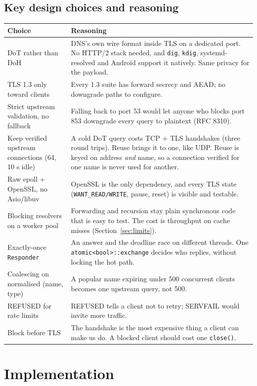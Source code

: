 \documentclass[11pt,a4paper]{article}
\newcommand{\code}[1]{\texttt{#1}}
\begin{document}
\subsection{Key design choices and reasoning}
\begin{tabularx}{\textwidth}{@{}P{4.2cm}L@{}}
\toprule
Choice & Reasoning \\
\midrule
DoT rather than DoH & DNS's own wire format inside TLS on a dedicated port. No HTTP/2 stack needed, and \code{dig}, \code{kdig}, systemd-resolved and Android support it natively. Same privacy for the payload. \\
TLS 1.3 only toward clients & Every 1.3 suite has forward secrecy and AEAD; no downgrade paths to configure. \\
Strict upstream validation, no fallback & Falling back to port 53 would let anyone who blocks port 853 downgrade every query to plaintext (RFC 8310). \\
Keep verified upstream connections (64, 10 s idle) & A cold DoT query costs TCP + TLS handshakes (three round trips). Reuse brings it to one, like UDP. Reuse is keyed on address \emph{and} name, so a connection verified for one name is never used for another. \\
Raw epoll + OpenSSL, no Asio/libuv & OpenSSL is the only dependency, and every TLS state (\code{WANT\_READ/WRITE}, pause, reset) is visible and testable. \\
Blocking resolvers on a worker pool & Forwarding and recursion stay plain synchronous code that is easy to test. The cost is throughput on cache misses (Section~\ref{sec:limits}). \\
Exactly-once \code{Responder} & An answer and the deadline race on different threads. One \code{atomic<bool>::exchange} decides who replies, without locking the hot path. \\
Coalescing on normalised (name, type) & A popular name expiring under 500 concurrent clients becomes one upstream query, not 500. \\
REFUSED for rate limits & REFUSED tells a client not to retry; SERVFAIL would invite more traffic. \\
Block before TLS & The handshake is the most expensive thing a client can make us do. A blocked client should cost one \code{close()}. \\
\bottomrule
\end{tabularx}

\section{Implementation}
\end{document}
